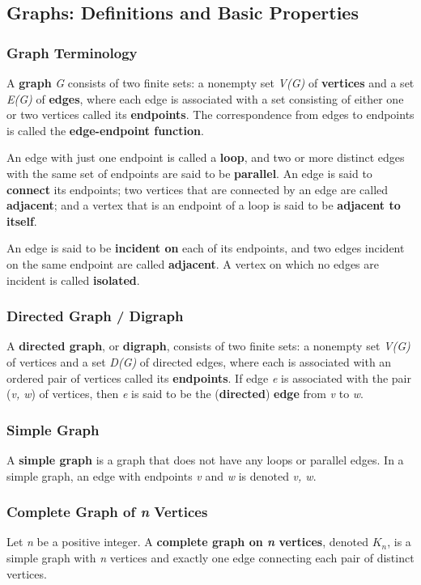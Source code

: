 \documentclass{article}
\begin{document}
\setcounter{section}{9}
\subsection{Graphs: Definitions and Basic Properties}
\subsubsection{Graph Terminology}
A \textbf{graph} \textit{G} consists of two finite sets: a nonempty set \textit{V(G)} of \textbf{vertices} and a set \textit{E(G)} of \textbf{edges}, where each edge is associated with a set consisting of either one or two vertices called its \textbf{endpoints}. The correspondence from edges to endpoints is called the \textbf{edge-endpoint function}.

An edge with just one endpoint is called a \textbf{loop}, and two or more distinct edges with the same set of endpoints are said to be \textbf{parallel}. An edge is said to \textbf{connect} its endpoints; two vertices that are connected by an edge are called \textbf{adjacent}; and a vertex that is an endpoint of a loop is said to be \textbf{adjacent to itself}.

An edge is said to be \textbf{incident on} each of its endpoints, and two edges incident on the same endpoint are called \textbf{adjacent}. A vertex on which no edges are incident is called \textbf{isolated}.

\subsubsection{Directed Graph / Digraph}
A \textbf{directed graph}, or \textbf{digraph}, consists of two finite sets: a nonempty set \textit{V(G)} of vertices and a set \textit{D(G)} of directed edges, where each is associated with an ordered pair of vertices called its \textbf{endpoints}. If edge \textit{e} is associated with the pair (\textit{v, w}) of vertices, then \textit{e} is said to be the (\textbf{directed}) \textbf{edge} from \textit{v} to \textit{w}.

\subsubsection{Simple Graph}
A \textbf{simple graph} is a graph that does not have any loops or parallel edges. In a simple graph, an edge with endpoints \textit{v} and \textit{w} is denoted {\textit{v, w}}.

\subsubsection{Complete Graph of \textit{n} Vertices}
Let \textit{n} be a positive integer. A \textbf{complete graph on \textit{n} vertices}, denoted $K_n$, is a simple graph with \textit{n} vertices and exactly one edge connecting each pair of distinct vertices.
\end{document}
